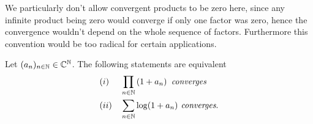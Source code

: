\begin{remark}
	We particularly don't allow convergent products to be zero here, since any infinite product being zero would converge if only one factor was zero, hence the convergence wouldn't depend on the whole sequence of factors. Furthermore this convention would be too radical for certain applications.
\end{remark}


\begin{lemma}
	Let $(a_n)_{n \in \mathbb{N}} \in \mathbb{C}^{\mathbb{N}}$. The following statements are equivalent
\begin{equation*}
\begin{aligned}
	&(i) &&\prod_{n \in \mathbb{N}} \left(1 + a_n\right) \textit{ converges} \\
	&(ii) &&\sum_{n \in \mathbb{N}} \log(1 + a_n) \textit{ converges}.
\end{aligned}
\end{equation*}
\end{lemma}
